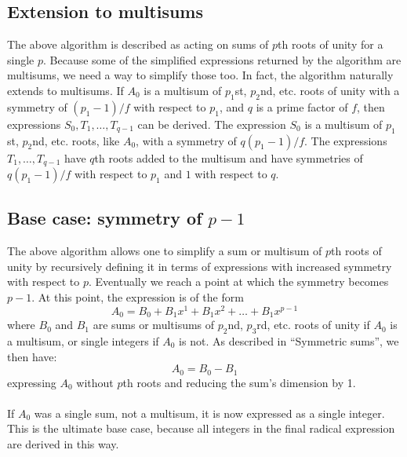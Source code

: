 \documentclass{article}
\begin{document}
\subsection{Extension to multisums}
    The above algorithm is described as acting on sums of $ p $th roots of unity for a single $ p $. Because some of the simplified expressions returned by the algorithm are multisums, we need a way to simplify those too. In fact, the algorithm naturally extends to multisums. If $ A_0 $ is a multisum of $ p_1 $st, $ p_2 $nd, etc. roots of unity with a symmetry of $ (p_1 - 1)/f $ with respect to $ p_1 $, and $ q $ is a prime factor of $ f $, then expressions $ S_0, T_1, \dots, T_{q - 1} $ can be derived. The expression $ S_0 $ is a multisum of $ p_1 $st, $ p_2 $nd, etc. roots, like $ A_0 $, with a symmetry of $ q(p_1 - 1)/f $. The expressions $ T_1, \dots, T_{q - 1} $ have $ q $th roots added to the multisum and have symmetries of $ q(p_1 - 1)/f $ with respect to $ p_1 $ and $ 1 $ with respect to $ q $.\\
\subsection{Base case: symmetry of $ p - 1 $}
    The above algorithm allows one to simplify a sum or multisum of $ p $th roots of unity by recursively defining it in terms of expressions with increased symmetry with respect to $ p $. Eventually we reach a point at which the symmetry becomes $ p - 1 $. At this point, the expression is of the form
    $$ A_0 = B_0 + B_1 x^1 + B_1 x^2 + \dots + B_1 x^{p - 1} $$
    where $ B_0 $ and $ B_1 $ are sums or multisums of $ p_2 $nd, $ p_3 $rd, etc. roots of unity if $ A_0 $ is a multisum, or single integers if $ A_0 $ is not. As described in ``Symmetric sums'', we then have:
    $$ A_0 = B_0 - B_1 $$
    expressing $ A_0 $ without $ p $th roots and reducing the sum's dimension by 1.\\
    \\
    If $ A_0 $ was a single sum, not a multisum, it is now expressed as a single integer. This is the ultimate base case, because all integers in the final radical expression are derived in this way.\\
\end{document}
